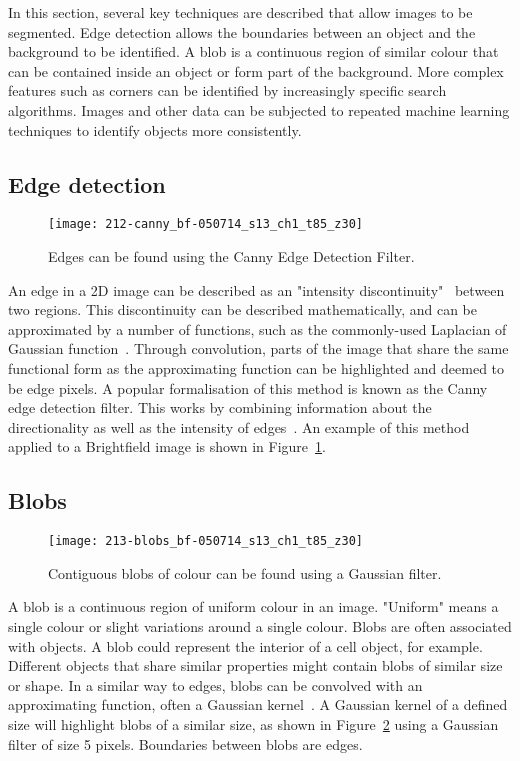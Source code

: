 In this section, several key techniques are described that allow images to be segmented. Edge detection allows the boundaries between an object and the background to be identified. A blob is a continuous region of similar colour that can be contained inside an object or form part of the background. More complex features such as corners can be identified by increasingly specific search algorithms. Images and other data can be subjected to repeated machine learning techniques to identify objects more consistently.

\subsection{Edge detection}

\begin{figure}[htbp!]
\centering
\texttt{[image: 212-canny\_bf-050714\_s13\_ch1\_t85\_z30]}
\caption[The Canny filter]{Edges can be found using the Canny Edge Detection Filter.}
\label{fig:canny_filter_bf}
\end{figure}

An edge in a 2D image can be described as an "intensity discontinuity"~\cite{haralick} between two regions. This discontinuity can be described mathematically, and can be approximated by a number of functions, such as the commonly-used Laplacian of Gaussian function~\cite{sotak}. Through convolution, parts of the image that share the same functional form as the approximating function can be highlighted and deemed to be edge pixels. A popular formalisation of this method is known as the Canny edge detection filter. This works by combining information about the directionality as well as the intensity of edges~\cite{canny}. An example of this method applied to a Brightfield image is shown in Figure~\ref{fig:canny_filter_bf}.

\subsection{Blobs}

\begin{figure}[htbp!]
\centering
\texttt{[image: 213-blobs\_bf-050714\_s13\_ch1\_t85\_z30]}
\caption[Blob detection]{Contiguous blobs of colour can be found using a Gaussian filter.}
\label{fig:blob_detection_bf}
\end{figure}

A blob is a continuous region of uniform colour in an image. "Uniform" means a single colour or slight variations around a single colour. Blobs are often associated with objects. A blob could represent the interior of a cell object, for example. Different objects that share similar properties might contain blobs of similar size or shape. In a similar way to edges, blobs can be convolved with an approximating function, often a Gaussian kernel~\cite{lindeberg}. A Gaussian kernel of a defined size will highlight blobs of a similar size, as shown in Figure~\ref{fig:blob_detection_bf} using a Gaussian filter of size 5 pixels. Boundaries between blobs are edges.


